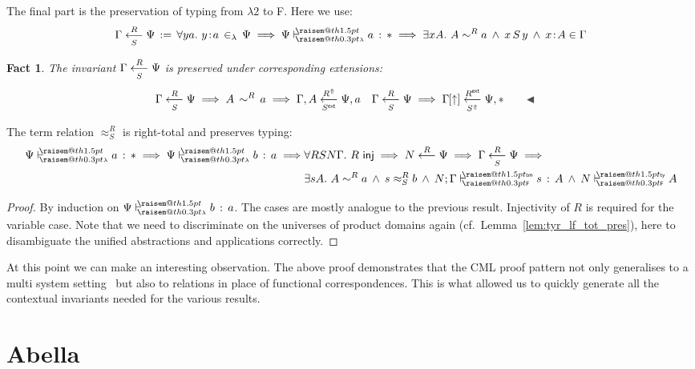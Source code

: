 \documentclass[a4paper,UKenglish]{lipics-v2016}
\makeatletter
\newcommand{\ms}{\,}
\newcommand{\mrel}[1]{\mathrel{\ms #1 \ms}}
\newcommand{\OF}{\mrel{:}}
\newcommand{\mAnd}{\mrel{\wedge}}
\newcommand{\mAll}[1]{\ensuremath{\forall} #1.\ms\ms}
\newcommand{\mEx}[1]{\ensuremath{\exists} #1.\ms\ms}
\newcommand{\eqdef}{\mrel{:=}}
\newcommand{\SysL}{$\lambda2$\xspace}
\newcommand{\ty}{\mathsf{ty}}
\newcommand{\tm}{\mathsf{tm}}
\newcommand{\of}{\ensuremath{\!:\!}}
\newcommand{\cc}[2]{#1;#2} %
\newcommand{\raisemath}[1]{\mathpalette{\raisem@th{#1}}}
\newcommand{\raisem@th}[3]{\raisebox{#1}{\ensuremath{#2#3}}}
\newcommand{\tsAnnot}[2]{\vdash\hspace{-.7em}^{\raisemath{1.5pt}{\scriptscriptstyle{#2}}}_{\raisemath{0.3pt}{\scriptscriptstyle{#1}}}} %
\newcommand{\tfF}{\tsAnnot{\mathsf{F}}{\ty}}  %
\newcommand{\tyF}{\tsAnnot{\mathsf{F}}{\tm}}  %
\newcommand{\istyF}[2]{\ensuremath{{#1} \mathrel{\tfF} #2}}
\newcommand{\typingF}[3]{\ensuremath{{#1} \mathrel{\tyF} #2 \OF #3}}
\newcommand{\tyL}{\tsAnnot{\lambda}{}} %
\newcommand{\typingL}[3]{\ensuremath{{#1} \mathrel{\tyL} #2 \OF #3}}
\newcommand{\inL}{\mrel{\in_{\lambda}}}
\newcommand{\tyr}{\mathrel{\sim}}
\newcommand{\tmr}{\mathrel{\approx}}
\newcommand{\Rext}[1]{\ensuremath{#1^{\mathsf{ext}}}}
\newcommand{\Rshift}[1]{\ensuremath{#1^{\Uparrow}}}
\newcommand{\tyctxrelLF}[3]{\ensuremath{#1\mathrel{\mathop{\longleftarrow}^{#2}\limits}#3}}
\newcommand{\tmctxrelLF}[4]{\ensuremath{#1\mathrel{\mathop{\longleftarrow}^{#2}_{#3}\limits}#4}}
\newcommand{\Prp}{\ensuremath{\textrm{\textasteriskcentered}}}
\newcommand{\subst}[1]{\hphantom{|}\!\![{#1}]}
\newcommand{\shift}{\ensuremath{\uparrow}}
\theoremstyle{plain}
\newtheorem{fact}[theorem]{Fact}
\makeatother
\begin{document}
The final part is the preservation of typing from \SysL to F.
Here we use:
\begin{align*}
  \tmctxrelLF{\Gamma}{R}{S}{\Psi} \eqdef \mAll{y a} y \of a \inL \Psi \implies \typingL{\Psi}{a}{\Prp} \implies \mEx{x A} A \tyr^R a \mAnd x\,S\,y \mAnd x \of A \in \Gamma
\end{align*}
\begin{fact}
  \label{fac:inv-tmlf-ext}
  The invariant $\tmctxrelLF{\Gamma}{R}{S}{\Psi}$ is preserved under corresponding extensions:
  \begin{align*}
    &\tmctxrelLF{\Gamma}{R}{S}{\Psi} \implies A\,\tyr^R\,a \implies \tmctxrelLF{\Gamma,A}{\Rshift{R}}{\Rext{S}}{\Psi,a} & &\tmctxrelLF{\Gamma}{R}{S}{\Psi} \implies \tmctxrelLF{\Gamma\subst{\shift}}{\Rext{R}}{\Rshift{S}}{\Psi,\Prp}\tag*{\qedsymbol}
  \end{align*}
\end{fact}
\begin{lemma}
  The term relation $\tmr^R_S$ is right-total and preserves typing:
  \begin{align*}
    \typingL{\Psi}{a}{\Prp} \implies \typingL{\Psi}{b}{a} \implies &\mAll{R S N \Gamma} R\ms\ms\mathsf{inj} \implies \tyctxrelLF{N}{R}{\Psi} \implies \tmctxrelLF{\Gamma}{R}{S}{\Psi} \implies \\
                                                                &\mEx{s A} A \tyr^R a \mAnd s \tmr^R_S b \mAnd \typingF{\cc{N}{\Gamma}}{s}{A} \mAnd \istyF{N}{A}
  \end{align*}
\end{lemma}
\begin{proof}
  By induction on $\typingL{\Psi}{b}{a}$.
  The cases are mostly analogue to the previous result.
  Injectivity of $R$ is required for the variable case.
  Note that we need to discriminate on the universes of product domains again (cf.\ Lemma~\ref{lem:tyr_lf_tot_pres}), here to disambiguate the unified abstractions and applications correctly.
\end{proof}

At this point we can make an interesting observation.
The above proof demonstrates that the CML proof pattern not only generalises to a multi system setting~\cite{KaiserEtAl:2017:sysf_pts_equiv_coq} but also to relations in place of functional correspondences.
This is what allowed us to quickly generate all the contextual invariants needed for the various results.

\section{Abella}
\label{sec:abella}
\end{document}
